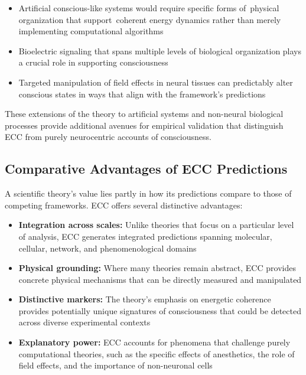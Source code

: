 \begin{itemize}
    \item {}Artificial conscious-like systems would require specific forms of~physical organization that support~coherent energy dynamics rather than merely implementing computational algorithms~\cite{seth2024conscious, butlin2023consciousnessartificialintelligenceinsights, anderson2024physical}
    
    \item {}Bioelectric signaling that spans multiple levels of biological organization plays a crucial role in supporting consciousness~\cite{Levin2018, levin2020revisiting, Pietak2017}
    
    \item Targeted manipulation of field effects in neural tissues can predictably alter conscious states in ways that align with the framework's predictions~\cite{ruffini2020realistic, pinotsis2023vivo}
\end{itemize}

These extensions of the theory to artificial systems and non-neural biological processes provide additional avenues for empirical validation that distinguish ECC from purely neurocentric accounts of consciousness.

\subsection*{Comparative Advantages of ECC Predictions}

A scientific theory's value lies partly in how its predictions compare to those of competing frameworks. ECC offers several distinctive advantages:

\begin{itemize}
    \item \textbf{Integration across scales:} Unlike theories that focus on a particular level of analysis, ECC generates integrated predictions spanning molecular, cellular, network, and phenomenological domains
    
    \item \textbf{Physical grounding:} Where many theories remain abstract, ECC provides concrete physical mechanisms that can be directly measured and manipulated
    
    \item \textbf{Distinctive markers:} The theory's emphasis on energetic coherence provides potentially unique signatures of consciousness that could be detected across diverse experimental contexts
    
    \item \textbf{Explanatory power:} ECC accounts for phenomena that challenge purely computational theories, such as the specific effects of anesthetics, the role of field effects, and the importance of non-neuronal cells
\end{itemize}

